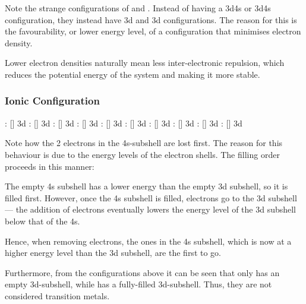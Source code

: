 				Note the strange configurations of  and . Instead of having a 3d4s\sps{2} or 3d4s configuration,
				they instead have 3d and 3d configurations. The reason for this is the favourability, or lower energy level, of
				a configuration that minimises electron density.

				Lower electron densities naturally mean less inter-electronic repulsion, which reduces the potential energy of the system and
				making it more stable.



			\subsubsection{Ionic Configuration}

				\tabto{0mm}:	\tabto{35mm}[] 3d
				\tabto{0mm}:	\tabto{35mm}[] 3d
				\tabto{0mm}:	\tabto{35mm}[] 3d
				\tabto{0mm}:	\tabto{35mm}[] 3d
				\tabto{0mm}:	\tabto{35mm}[] 3d
				\tabto{0mm}:	\tabto{35mm}[] 3d
				\tabto{0mm}:	\tabto{35mm}[] 3d
				\tabto{0mm}:	\tabto{35mm}[] 3d
				\tabto{0mm}:	\tabto{35mm}[] 3d
				\tabto{0mm}:	\tabto{35mm}[] 3d

				Note how the 2 electrons in the 4s-subshell are lost first. The reason for this behaviour is due to the energy levels of the
				electron shells. The filling order proceeds in this manner:


				The empty 4s subshell has a lower energy than the empty 3d subshell, so it is filled first. However, once the 4s subshell is
				filled, electrons go to the 3d subshell --- the addition of electrons eventually lowers the energy level of the 3d subshell
				below that of the 4s.

				Hence, when removing electrons, the ones in the 4s subshell, which is now at a higher energy level than the 3d subshell, are the
				first to go.

				Furthermore, from the configurations above it can be seen that  only has an empty 3d-subshell, while  has
				a fully-filled 3d-subshell. Thus, they are not considered transition metals.


